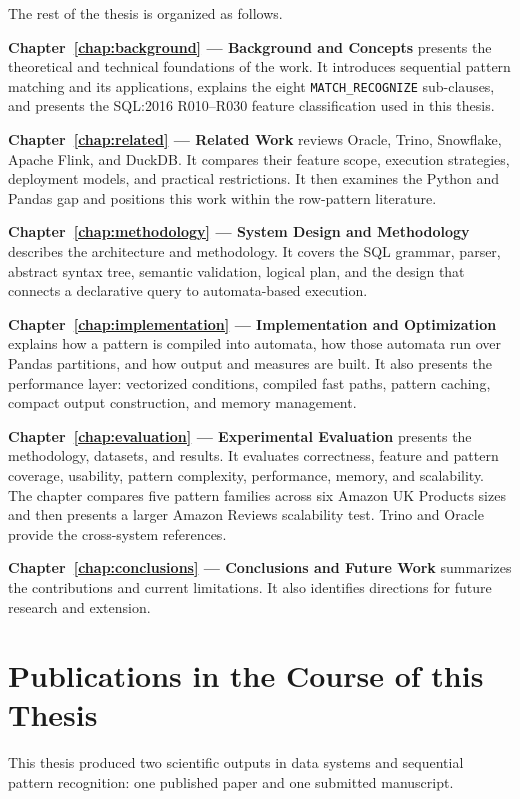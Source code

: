 The rest of the thesis is organized as follows.

\textbf{Chapter~\ref{chap:background} --- Background and Concepts}
presents the theoretical and technical foundations of the work.  It
introduces sequential pattern matching and its applications, explains the
eight \texttt{MATCH\_RECOGNIZE} sub-clauses, and presents the SQL:2016
R010--R030 feature classification used in this thesis.

\textbf{Chapter~\ref{chap:related} --- Related Work}
reviews Oracle, Trino, Snowflake, Apache Flink, and DuckDB.  It compares
their feature scope, execution strategies, deployment models, and practical
restrictions.  It then examines the Python and Pandas gap and positions this
work within the row-pattern literature.

\textbf{Chapter~\ref{chap:methodology} --- System Design and Methodology}
describes the architecture and methodology.  It covers the SQL grammar,
parser, abstract syntax tree, semantic validation, logical plan, and the
design that connects
a declarative query to automata-based execution.

\textbf{Chapter~\ref{chap:implementation} --- Implementation and Optimization}
explains how a pattern is compiled into automata, how those automata run
over Pandas partitions, and how output and measures are built.  It also presents the performance layer: vectorized
conditions, compiled fast paths, pattern caching, compact output
construction, and memory management.

\textbf{Chapter~\ref{chap:evaluation} --- Experimental Evaluation}
presents the methodology, datasets, and results.  It evaluates correctness,
feature and pattern coverage, usability, pattern complexity, performance,
memory, and scalability.  The chapter compares five pattern families across
six Amazon UK Products sizes and then presents a larger Amazon Reviews
scalability test.  Trino and Oracle provide the cross-system references.

\textbf{Chapter~\ref{chap:conclusions} --- Conclusions and Future Work}
summarizes the contributions and current limitations.  It also identifies
directions for future research and extension.

\section{Publications in the Course of this Thesis}

This thesis produced two scientific outputs in data systems and sequential
pattern recognition: one published paper and one submitted manuscript.

